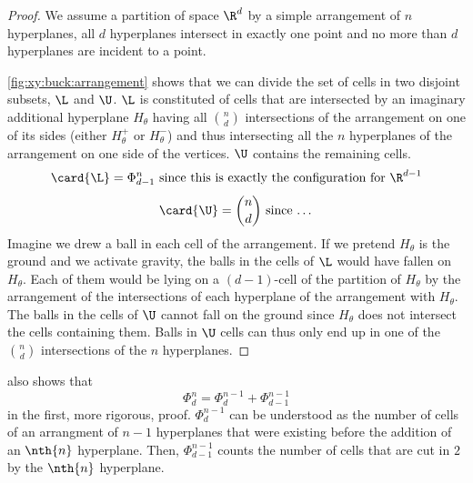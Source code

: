 \begin{proof}
We assume a partition of space \(\R^d\) by a simple arrangement of \(n\)
hyperplanes, \ie all \(d\) hyperplanes intersect in exactly one point and no
more than \(d\) hyperplanes are incident to a point.

\ref{fig:xy:buck:arrangement} shows that we can divide the set of cells in two
disjoint subsets, \(\L\) and \(\U\). \(\L\) is constituted of cells that are
intersected by an imaginary additional hyperplane \(H_{\theta}\) having all
\(\binom{n}{d}\) intersections of the arrangement on one of its sides (either
\(H_{\theta}^{+}\) or \(H_{\theta}^{-}\)) and thus intersecting all the \(n\)
hyperplanes of the arrangement on one side of the vertices. \(\U\) contains the
remaining cells.
\begin{displaymath}
\card{\L} = \Phi_{d-1}^n \text{ since this is exactly the configuration for } \R^{d-1}
\end{displaymath}
\begin{displaymath}
\card{\U} = \binom{n}{d} \text{ since \dots}
\end{displaymath}
Imagine we drew a ball in each cell of the arrangement. If we pretend
\(H_{\theta}\) is the ground and we activate gravity, the balls in the cells of
\(\L\) would have fallen on \(H_{\theta}\). Each of them would be lying on a
\((d-1)\)-cell of the partition of \(H_{\theta}\) by the arrangement of the
intersections of each hyperplane of the arrangement with \(H_{\theta}\). The
balls in the cells of \(\U\) cannot fall on the ground since \(H_{\theta}\)
does not intersect the cells containing them. Balls in \(\U\) cells can thus
only end up in one of the \(\binom{n}{d}\) intersections of the \(n\)
hyperplanes.
\end{proof}

\citet*{matousek:2002} also shows that
\begin{displaymath}
\Phi_d^n = \Phi_d^{n-1} + \Phi_{d-1}^{n-1}
\end{displaymath}
in the first, more rigorous, proof. \(\Phi_d^{n-1}\) can be understood as the
number of cells of an arrangment of \(n-1\) hyperplanes that were existing
before the addition of an \(\nth{n}\) hyperplane. Then, \(\Phi_{d-1}^{n-1}\)
counts the number of cells that are cut in \(2\) by the \(\nth{n}\) hyperplane.
